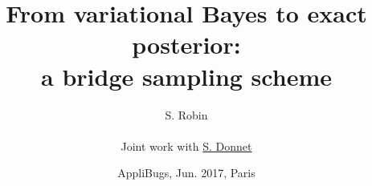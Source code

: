 \documentclass[10pt]{beamer}
\begin{document}

\title[From variational Bayes to exact posterior]{From variational Bayes to exact posterior: \\
  a bridge sampling scheme}

\author[S. Robin]{S. Robin \\ ~\\
    Joint work with \underline{S. Donnet}
  }


\date[June 2017, Paris]{AppliBugs, Jun. 2017, Paris}

\maketitle

\end{document}
